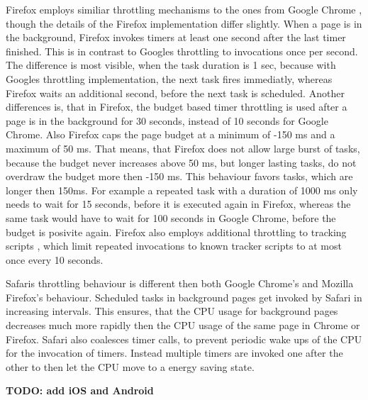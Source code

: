 \documentclass[
	ngerman,
	ruledheaders=section,%
	class=report,%
	thesis={type=bachelor},%
	accentcolor=9c,%
	custommargins=true,%
	marginpar=false,%
	parskip=half-,%
	fontsize=11pt,%
]{tudapub}
\begin{document}
  Firefox employs similiar throttling mechanisms to the ones from Google Chrome \cite{mdn-page-visibility}, though the details of the Firefox implementation differ slightly. When a page is in the background, Firefox invokes timers at least one second after the last timer finished. This is in contrast to Googles throttling to invocations once per second. The difference is most visible, when the task duration is 1 sec, because with Googles throttling implementation, the next task fires immediatly, whereas Firefox waits an additional second, before the next task is scheduled. Another differences is, that in Firefox, the budget based timer throttling is used after a page is in the background for 30 seconds, instead of 10 seconds for Google Chrome. Also Firefox caps the page budget at a minimum of -150 ms and a maximum of 50 ms. That means, that Firefox does not allow large burst of tasks, because the budget never increases above 50 ms, but longer lasting tasks, do not overdraw the budget more then -150 ms. This behaviour favors tasks, which are longer then 150ms. For example a repeated task with a duration of 1000 ms only needs to wait for 15 seconds, before it is executed again in Firefox, whereas the same task would have to wait for 100 seconds in Google Chrome, before the budget is posivite again. Firefox also employs additional throttling to tracking scripts \cite{mdn-tracker-throttling}, which limit repeated invocations to known tracker scripts to at most once every 10 seconds.

  Safaris throttling behaviour is different then both Google Chrome's and Mozilla Firefox's behaviour. Scheduled tasks in background pages get invoked by Safari in increasing intervals. This ensures, that the CPU usage for background pages decreases much more rapidly then the CPU usage of the same page in Chrome or Firefox. Safari also coalesces timer calls, to prevent periodic wake ups of the CPU for the invocation of timers. Instead multiple timers are invoked one after the other to then let the CPU move to a energy saving state.

  \textbf{TODO: add iOS and Android}
  
\end{document}
